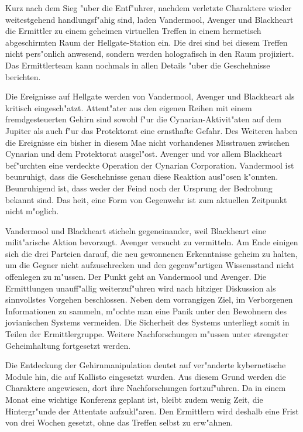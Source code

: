 
Kurz nach dem Sieg "uber die Entf"uhrer, nachdem verletzte Charaktere wieder weitestgehend handlungsf"ahig sind, laden Vandermool, Avenger und Blackheart die Ermittler zu einem geheimen virtuellen Treffen in einem hermetisch abgeschirmten Raum der Hellgate-Station ein. Die drei sind bei diesem Treffen nicht pers"onlich anwesend, sondern werden holografisch in den Raum projiziert. Das Ermittlerteam kann nochmals in allen Details "uber die Geschehnisse berichten.

Die Ereignisse auf Hellgate werden von Vandermool, Avenger und Blackheart als kritisch eingesch"atzt. Attent"ater aus den eigenen Reihen mit einem fremdgesteuerten Gehirn sind sowohl f"ur die Cynarian-Aktivit"aten auf dem Jupiter als auch f"ur das Protektorat eine ernsthafte Gefahr. Des Weiteren haben die Ereignisse ein bisher in diesem Ma\3e nicht vorhandenes Misstrauen zwischen Cynarian und dem Protektorat ausgel"ost. Avenger und vor allem Blackheart bef"urchten eine verdeckte Operation der Cynarian Corporation. Vandermool ist beunruhigt, dass die Geschehnisse genau diese Reaktion ausl"osen k"onnten. Beunruhigend ist, dass weder der Feind noch der Ursprung der Bedrohung bekannt sind. Das hei\3t, eine Form von Gegenwehr ist zum aktuellen Zeitpunkt nicht m"oglich.

Vandermool und Blackheart sticheln gegeneinander, weil Blackheart eine milit"arische Aktion bevorzugt. Avenger versucht zu vermitteln. Am Ende einigen sich die drei Parteien darauf, die neu gewonnenen Erkenntnisse geheim zu halten, um die Gegner nicht aufzuschrecken und den gegenw"artigen Wissensstand nicht offenlegen zu m"ussen. Der Punkt geht an Vandermool und Avenger. Die Ermittlungen unauff"allig weiterzuf"uhren wird nach hitziger Diskussion als sinnvollstes Vorgehen beschlossen. Neben dem vorrangigen Ziel, im Verborgenen Informationen zu sammeln, m"ochte man eine Panik unter den Bewohnern des jovianischen Systems vermeiden. Die Sicherheit des Systems unterliegt somit in Teilen der Ermittlergruppe. Weitere Nachforschungen m"ussen unter strengster Geheimhaltung fortgesetzt werden.

Die Entdeckung der Gehirnmanipulation deutet auf ver"anderte kybernetische Module hin, die auf Kallisto eingesetzt wurden. Aus diesem Grund werden die Charaktere angewiesen, dort ihre Nachforschungen fortzuf"uhren. Da in einem Monat eine wichtige Konferenz geplant ist, bleibt zudem wenig Zeit, die Hintergr"unde der Attentate aufzukl"aren. Den Ermittlern wird deshalb eine Frist von drei Wochen gesetzt, ohne das Treffen selbst zu erw"ahnen.

